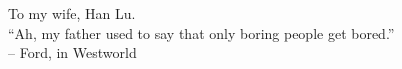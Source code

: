 

\begin{dedication}
   To my wife, Han Lu. \\[3ex]
   ``Ah, my father used to say that only boring people get bored.''\\
         -- Ford, in Westworld
\end{dedication}
